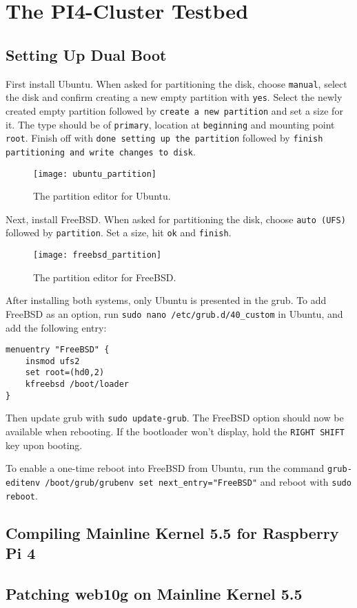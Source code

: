\chapter{The PI4-Cluster Testbed}

\section{Setting Up Dual Boot}

First install Ubuntu. When asked for partitioning the disk, choose \lstinline{manual}, select the disk and confirm creating a new empty partition with \lstinline{yes}. Select the newly created empty partition followed by \lstinline{create a new partition} and set a size for it. The type should be of \lstinline{primary}, location at \lstinline{beginning} and mounting point \lstinline{root}. Finish off with \lstinline{done setting up the partition} followed by \lstinline{finish partitioning and write changes to disk}.

\begin{figure}[H]
    \centering
    \texttt{[image: ubuntu\_partition]}
    \captionsetup{width=0.75\linewidth}
    \caption{The partition editor for Ubuntu.}
    \label{fig:ubuntu_partition}
\end{figure}

Next, install FreeBSD. When asked for partitioning the disk, choose \lstinline{auto (UFS)} followed by \lstinline{partition}. Set a size, hit \lstinline{ok} and \lstinline{finish}.

\begin{figure}[H]
    \centering
    \texttt{[image: freebsd\_partition]}
    \captionsetup{width=0.75\linewidth}
    \caption{The partition editor for FreeBSD.}
    \label{fig:freebsd_partition}
\end{figure}

After installing both systems, only Ubuntu is presented in the \gls{grub}. To add FreeBSD as an option, run \lstinline{sudo nano /etc/grub.d/40_custom} in Ubuntu, and add the following entry:

\begin{lstlisting}
menuentry "FreeBSD" {
    insmod ufs2
    set root=(hd0,2)
    kfreebsd /boot/loader
}
\end{lstlisting}

Then update \gls{grub} with \lstinline{sudo update-grub}. The FreeBSD option should now be available when rebooting. If the bootloader won't display, hold the \lstinline{RIGHT SHIFT} key upon booting.

To enable a one-time reboot into FreeBSD from Ubuntu, run the command \lstinline{grub-editenv /boot/grub/grubenv set next_entry="FreeBSD"} and reboot with \lstinline{sudo reboot}.





\section{Compiling Mainline Kernel 5.5 for Raspberry Pi 4}


\section{Patching web10g on Mainline Kernel 5.5}